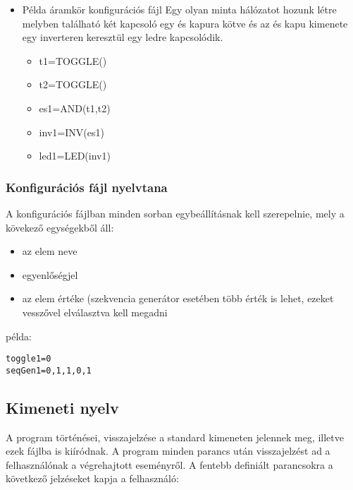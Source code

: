 \begin{itemize}
\item Példa áramkör konfigurációs fájl
Egy olyan minta hálózatot hozunk létre melyben található két kapcsoló egy és kapura kötve és az és kapu kimenete egy inverteren keresztül egy ledre kapcsolódik.
	\begin{itemize}
	\item t1=TOGGLE()
	\item t2=TOGGLE()
	\item es1=AND(t1,t2)	
	\item inv1=INV(es1)
	\item led1=LED(inv1)
	\end{itemize}	


\end{itemize}

\subsubsection{Konfigurációs fájl nyelvtana}

A konfigurációs fájlban minden sorban egybeállításnak kell szerepelnie, mely a kövekező egységekből áll:
\begin{itemize}
	\item az elem neve
	\item egyenlőségjel
	\item az elem értéke (szekvencia generátor esetében több érték is lehet, ezeket vesszővel elválasztva kell megadni
\end{itemize}

példa:
\begin{verbatim}
toggle1=0
seqGen1=0,1,1,0,1
\end{verbatim}

\subsection{Kimeneti nyelv}

A program történései, visszajelzése a standard kimeneten jelennek meg, illetve ezek fájlba is kiíródnak. A program minden parancs után visszajelzést ad a felhasználónak a végrehajtott eseményről. A fentebb definiált parancsokra a következő jelzéseket kapja a felhasználó:\newline

